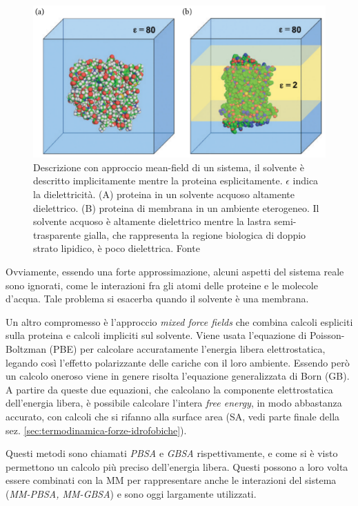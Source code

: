 {\begin{figure}[!htb]
	\centering
	\includegraphics[scale=0.4]{images/mean-field.png}
	\caption{Descrizione con approccio mean-field di un sistema, il solvente è descritto implicitamente mentre la proteina esplicitamente. $\epsilon$ indica la dielettricità. (A) proteina in un solvente acquoso altamente dielettrico. (B) proteina di membrana in un ambiente eterogeneo. Il solvente acquoso è altamente dielettrico mentre la lastra semi-trasparente gialla, che rappresenta la regione biologica di doppio strato lipidico, è poco dielettrica. Fonte\cite{kessel_ben-tal_2018}}
	\label{fig:mean-field}
\end{figure}

Ovviamente, essendo una forte approssimazione, alcuni aspetti del sistema reale sono ignorati, come le interazioni fra gli atomi delle proteine e le molecole d'acqua. Tale problema si esacerba quando il solvente è una membrana. \\

\par Un altro compromesso è l'approccio \textit{mixed force fields} che combina calcoli espliciti sulla proteina e calcoli impliciti sul solvente. Viene usata l'equazione di Poisson-Boltzman (PBE) per calcolare accuratamente l'energia libera elettrostatica, legando così l'effetto polarizzante delle cariche con il loro ambiente. Essendo però un calcolo oneroso viene in genere risolta l'equazione generalizzata di Born (GB). A partire da queste due equazioni, che calcolano la componente elettrostatica dell'energia libera, è possibile calcolare l'intera \textit{free energy}, in modo abbastanza accurato, con calcoli che si rifanno alla surface area (SA, vedi parte finale della sez. \ref{sec:termodinamica-forze-idrofobiche}). 

\par Questi metodi sono chiamati \textit{PBSA} e \textit{GBSA} rispettivamente, e come si è visto permettono un calcolo più preciso dell'energia libera. Questi possono a loro volta essere combinati con la MM per rappresentare anche le interazioni del sistema (\textit{MM-PBSA, MM-GBSA}) e sono oggi largamente utilizzati.

}
